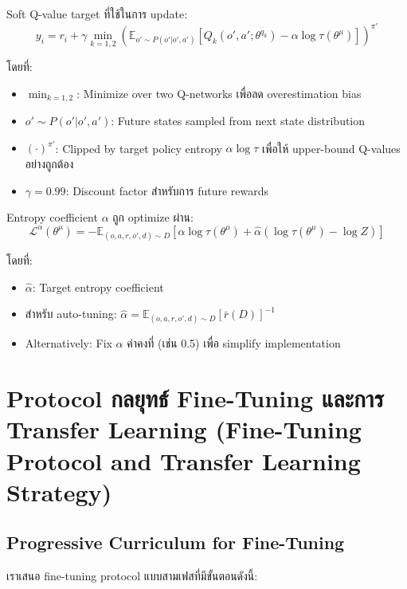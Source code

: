 \documentclass[10pt,a4paper,twocolumn]{article}
\begin{document}
Soft Q-value target ที่ใช้ในการ update:
\begin{equation}\label{eq:soft-tarqet-Q}
    y_i = r_i + \gamma \min_{k=1,2} \left( \mathbb{E}_{o' \sim P(o'|o',a')} [Q_k(o', a'; \theta^{q_k}) - \alpha \log \tau(\theta^{\mu})] \right)^{\pi'}
\end{equation}

โดยที่:
\begin{itemize}
    \item $\min_{k=1,2}$: Minimize over two Q-networks เพื่อลด overestimation bias
    \item $o' \sim P(o'|o',a')$: Future states sampled from next state distribution
    \item $(\cdot)^{\pi'}$: Clipped by target policy entropy $\alpha \log \tau$ เพื่อให้ upper-bound Q-values อย่างถูกต้อง
    \item $\gamma = 0.99$: Discount factor สำหรับการ future rewards
\end{itemize}

Entropy coefficient $\alpha$ ถูก optimize ผ่าน:
\begin{equation}\label{eq:sac-entropy-objective}
    \mathcal{L}^{\alpha}( \theta^{\mu}) = -\mathbb{E}_{(o,a,r,o',d)\sim D} \left[ \alpha \log \tau(\theta^{\mu}) + \hat{\alpha} (\log \tau(\theta^{\mu}) - \log Z) \right]
\end{equation}

โดยที่:
\begin{itemize}
    \item $\hat{\alpha}$: Target entropy coefficient
    \item สำหรับ auto-tuning: $\hat{\alpha} = \mathbb{E}_{(o,a,r,o',d)\sim D} [\bar{r}(D)]^{-1}$
    \item Alternatively: Fix $\alpha$ ค่าคงที่ (เช่น 0.5) เพื่อ simplify implementation
\end{itemize}

\section{Protocol กลยุทธ์ Fine-Tuning และการ Transfer Learning (Fine-Tuning Protocol and Transfer Learning Strategy)}

\subsection{Progressive Curriculum for Fine-Tuning}

เราเสนอ fine-tuning protocol แบบสามเฟสที่มีขั้นตอนดังนี้:
\end{document}
